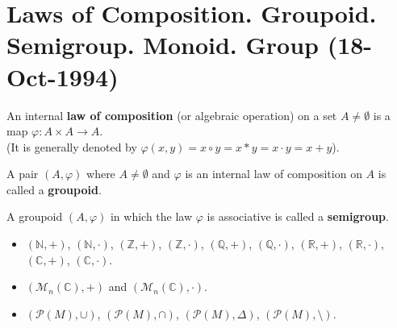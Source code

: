 
\section{Laws of Composition. Groupoid. Semigroup. Monoid. Group (18-Oct-1994)}

\begin{definition}
An internal \textbf{law of composition} (or algebraic operation) on a set $A \neq \emptyset$ is a map $\varphi: A \times A \rightarrow A$. \\
(It is generally denoted by $\varphi(x, y) = x \circ y = x * y = x \cdot y = x + y$).
\end{definition}

\begin{definition}
A pair $(A, \varphi)$ where $A \neq \emptyset$ and $\varphi$ is an internal law of composition on $A$ is called a \textbf{groupoid}.
\end{definition}

\begin{definition}
A groupoid $(A, \varphi)$ in which the law $\varphi$ is associative is called a \textbf{semigroup}.
\end{definition}

\begin{example}\leavevmode
\begin{itemize}
    \item $(\mathbb{N}, +)$, $(\mathbb{N}, \cdot)$, $(\mathbb{Z}, +)$, $(\mathbb{Z}, \cdot)$, $(\mathbb{Q}, +)$, $(\mathbb{Q}, \cdot)$, $(\mathbb{R}, +)$, $(\mathbb{R}, \cdot)$, $(\mathbb{C}, +)$, $(\mathbb{C}, \cdot)$.
    \item $(\mathcal{M}_n(\mathbb{C}), +)$ and $(\mathcal{M}_n(\mathbb{C}), \cdot)$.
    \item $(\mathcal{P}(M), \cup)$, $(\mathcal{P}(M), \cap)$, $(\mathcal{P}(M), \Delta)$, $(\mathcal{P}(M), \setminus)$.
\end{itemize}
\end{example}

